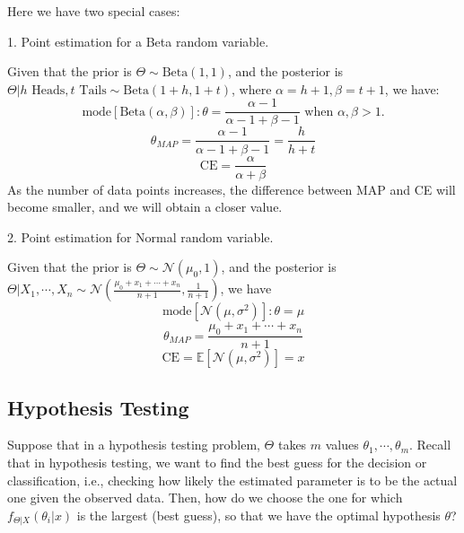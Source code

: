 Here we have two special cases: 

1. Point estimation for a Beta random variable.

Given that the prior is \(\Theta \sim \text{Beta}(1, 1)\), and the posterior is \(\Theta \vert h \text{ Heads}, t \text{ Tails} \sim \text{Beta}(1 + h, 1 + t)\), where \(\alpha = h + 1, \beta = t + 1\), we have: 
\[
  \text{mode}[\text{Beta}(\alpha, \beta)]: \theta = \dfrac{\alpha - 1}{\alpha - 1 + \beta - 1} \text{ when } \alpha, \beta >1.  
\]
\[
  \theta_{MAP} = \dfrac{\alpha - 1}{\alpha - 1 + \beta - 1} = \dfrac{h}{h + t}
\]
\[
  \text{CE} = \dfrac{\alpha}{\alpha + \beta}
\]
As the number of data points increases, the difference between MAP and CE will become smaller, and we will obtain a closer value. 

2. Point estimation for Normal random variable. 

Given that the prior is \(\Theta \sim \mathcal{N}(\mu_0, 1)\), and the posterior is \(\Theta \vert X_1, \cdots, X_n \sim \mathcal{N} (\frac{\mu_0 + x_1 + \cdots + x_n }{n + 1}, \frac{1}{n + 1})\), we have 
\[
  \text{mode}[\mathcal{N} (\mu, \sigma^2)]: \theta = \mu 
\]
\[
  \theta_{MAP} = \dfrac{\mu_0 + x_1 + \cdots + x_n }{n + 1}
\]
\[
  \text{CE} = \mathbb{E}[\mathcal{N} (\mu, \sigma^2)] = x
\]

\subsection{Hypothesis Testing}
Suppose that in a hypothesis testing problem, \(\Theta\) takes \(m\) values \(\theta_1, \cdots, \theta_m\). Recall that in hypothesis testing, we want to find the best guess for the decision or classification, i.e., checking how likely the estimated parameter is to be the actual one given the observed data. Then, how do we choose the one for which \(f_{\Theta \vert X} (\theta_i \vert x)\) is the largest (best guess), so that we have the optimal hypothesis \(\theta\)?

